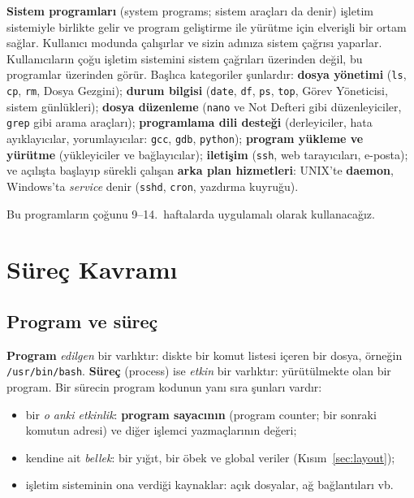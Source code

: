 \documentclass[11pt,a4paper]{article}
\newcommand{\term}[1]{\textbf{\color{mintdeep}#1}}
\newcommand{\cmd}[1]{\texttt{#1}}
\begin{document}
\term{Sistem programları} (system programs; sistem araçları da denir) işletim sistemiyle birlikte gelir ve program geliştirme ile yürütme için elverişli bir ortam sağlar. Kullanıcı modunda çalışırlar ve sizin adınıza sistem çağrısı yaparlar. Kullanıcıların çoğu işletim sistemini sistem çağrıları üzerinden değil, bu programlar üzerinden görür. Başlıca kategoriler şunlardır: \textbf{dosya yönetimi} (\cmd{ls}, \cmd{cp}, \cmd{rm}, Dosya Gezgini); \textbf{durum bilgisi} (\cmd{date}, \cmd{df}, \cmd{ps}, \cmd{top}, Görev Yöneticisi, sistem günlükleri); \textbf{dosya düzenleme} (\cmd{nano} ve Not Defteri gibi düzenleyiciler, \cmd{grep} gibi arama araçları); \textbf{programlama dili desteği} (derleyiciler, hata ayıklayıcılar, yorumlayıcılar: \cmd{gcc}, \cmd{gdb}, \cmd{python}); \textbf{program yükleme ve yürütme} (yükleyiciler ve bağlayıcılar); \textbf{iletişim} (\cmd{ssh}, web tarayıcıları, e-posta); ve açılışta başlayıp sürekli çalışan \textbf{arka plan hizmetleri}: UNIX'te \term{daemon}, Windows'ta \emph{service} denir (\cmd{sshd}, \cmd{cron}, yazdırma kuyruğu).

Bu programların çoğunu 9--14.~haftalarda uygulamalı olarak kullanacağız.

\section{Süreç Kavramı}
\label{sec:process}

\subsection{Program ve süreç}

\term{Program} \emph{edilgen} bir varlıktır: diskte bir komut listesi içeren bir dosya, örneğin \texttt{/usr/bin/bash}. \term{Süreç} (process) ise \emph{etkin} bir varlıktır: yürütülmekte olan bir program. Bir sürecin program kodunun yanı sıra şunları vardır:
\begin{itemize}
  \item bir \emph{o anki etkinlik}: \term{program sayacının} (program counter; bir sonraki komutun adresi) ve diğer işlemci yazmaçlarının değeri;
  \item kendine ait \emph{bellek}: bir yığıt, bir öbek ve global veriler (Kısım~\ref{sec:layout});
  \item işletim sisteminin ona verdiği kaynaklar: açık dosyalar, ağ bağlantıları vb.
\end{itemize}
\end{document}

